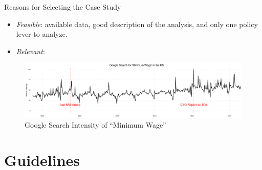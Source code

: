 \documentclass{beamer}
\begin{document}
\begin{frame}{Reasons for Selecting the Case Study}

\begin{itemize}
\item \textit{Feasible}: available data, good description of the analysis, and only one policy lever to analyze. 
\item \textit{Relevant}: 
\end{itemize}

\begin{figure}[h!]
\centering
\vspace*{-1em}
\hspace*{-1.7em}
\includegraphics[scale = 0.22]{../Images/min_wage_gtrend}
\vspace*{-0.8em}
\caption{Google Search Intensity of ``Minimum Wage''}
\label{mw_gtrend}
\end{figure}	

\end{frame}

\section{Guidelines}
\end{document}
